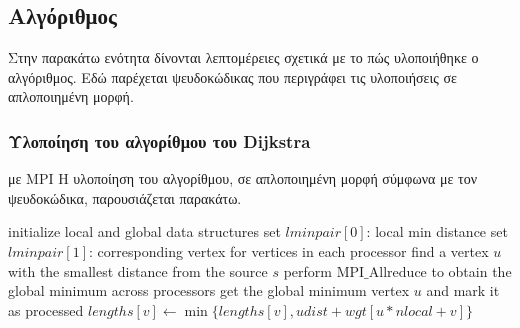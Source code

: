 \documentclass[12pt,a4paper]{article} %
\begin{document}
\subsection{Αλγόριθμος}
Στην παρακάτω ενότητα δίνονται λεπτομέρειες σχετικά με το πώς υλοποιήθηκε ο αλγόριθμος. Εδώ παρέχεται ψευδοκώδικας που περιγράφει τις υλοποιήσεις σε απλοποιημένη μορφή.
\vspace{0.2cm}

\subsubsection{Υλοποίηση του αλγορίθμου του Dijkstra} με MPI
Η υλοποίηση του αλγορίθμου, σε απλοποιημένη μορφή σύμφωνα με τον ψευδοκώδικα, παρουσιάζεται παρακάτω.

\begin{algorithm}[H]
\begin{algorithmic}[1]
    \State initialize local and global data structures
        \State set $lminpair[0]$: local min distance
        \State set $lminpair[1]$: corresponding vertex
    \EndFor
        \State for vertices in each processor find a vertex $u$ with the smallest distance from the source $s$
        \State perform $\mathrm{MPI\_Allreduce}$ to obtain the global minimum across processors
        \State get the global minimum vertex $u$ and mark it as processed
         
            \State $lengths[v] \gets \min\{lengths[v], udist + wgt[u* nlocal + v]\}$
        \EndFor
    \EndWhile
\EndProcedure
\end{algorithmic}
\end{algorithm}
\end{document}

